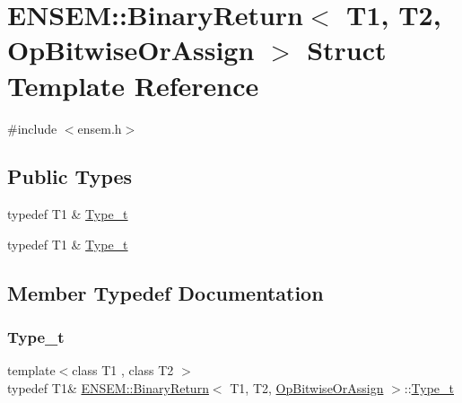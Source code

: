 \hypertarget{structENSEM_1_1BinaryReturn_3_01T1_00_01T2_00_01OpBitwiseOrAssign_01_4}{}\section{E\+N\+S\+EM\+:\+:Binary\+Return$<$ T1, T2, Op\+Bitwise\+Or\+Assign $>$ Struct Template Reference}
\label{structENSEM_1_1BinaryReturn_3_01T1_00_01T2_00_01OpBitwiseOrAssign_01_4}


{\ttfamily \#include $<$ensem.\+h$>$}

\subsection*{Public Types}
\begin{DoxyCompactItemize}
\item 
typedef T1 \& \mbox{\hyperlink{structENSEM_1_1BinaryReturn_3_01T1_00_01T2_00_01OpBitwiseOrAssign_01_4_a26b576167f103506b9c1a03f33944d0f}{Type\+\_\+t}}
\item 
typedef T1 \& \mbox{\hyperlink{structENSEM_1_1BinaryReturn_3_01T1_00_01T2_00_01OpBitwiseOrAssign_01_4_a26b576167f103506b9c1a03f33944d0f}{Type\+\_\+t}}
\end{DoxyCompactItemize}


\subsection{Member Typedef Documentation}
\mbox{\label{structENSEM_1_1BinaryReturn_3_01T1_00_01T2_00_01OpBitwiseOrAssign_01_4_a26b576167f103506b9c1a03f33944d0f}} 
\subsubsection{\texorpdfstring{Type\_t}{Type\_t}\hspace{0.1cm}{\footnotesize\ttfamily [1/2]}}
{\footnotesize\ttfamily template$<$class T1 , class T2 $>$ \\
typedef T1\& \mbox{\hyperlink{structENSEM_1_1BinaryReturn}{E\+N\+S\+E\+M\+::\+Binary\+Return}}$<$ T1, T2, \mbox{\hyperlink{structENSEM_1_1OpBitwiseOrAssign}{Op\+Bitwise\+Or\+Assign}} $>$\+::\mbox{\hyperlink{structENSEM_1_1BinaryReturn_3_01T1_00_01T2_00_01OpBitwiseOrAssign_01_4_a26b576167f103506b9c1a03f33944d0f}{Type\+\_\+t}}}

